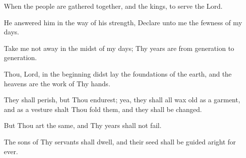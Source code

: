 When the people are gathered together, and the kings, to serve the Lord.

He answered him in the way of his strength, Declare unto me the fewness of my days.

Take me not away in the midst of my days; Thy years are from generation to generation.

Thou, Lord, in the beginning didst lay the foundations of the earth, and the heavens are the work of Thy hands.

They shall perish, but Thou endurest; yea, they shall all wax old as a garment, and as a vesture shalt Thou fold them, and they shall be changed.

But Thou art the same, and Thy years shall not fail.

The sons of Thy servants shall dwell, and their seed shall be guided aright for ever.
